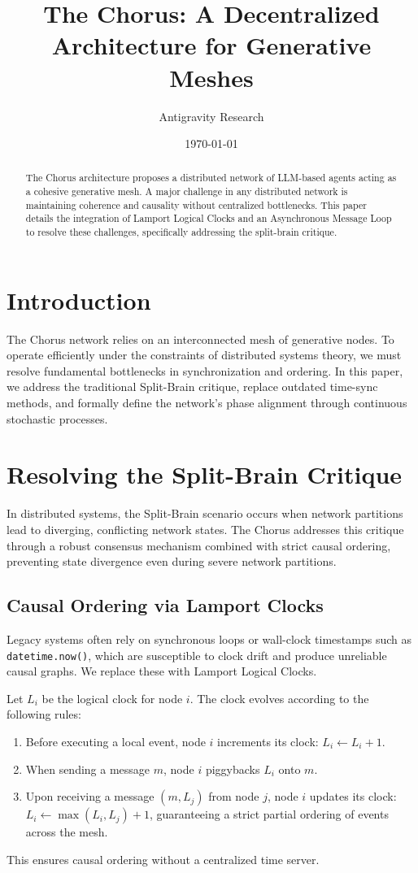 \documentclass{article}
\title{The Chorus: A Decentralized Architecture for Generative Meshes}
\author{Antigravity Research}
\date{\today}
\begin{document}
\maketitle

\begin{abstract}
The Chorus architecture proposes a distributed network of LLM-based agents acting as a cohesive generative mesh. A major challenge in any distributed network is maintaining coherence and causality without centralized bottlenecks. This paper details the integration of Lamport Logical Clocks and an Asynchronous Message Loop to resolve these challenges, specifically addressing the split-brain critique.
\end{abstract}

\section{Introduction}
The Chorus network relies on an interconnected mesh of generative nodes. To operate efficiently under the constraints of distributed systems theory, we must resolve fundamental bottlenecks in synchronization and ordering. In this paper, we address the traditional Split-Brain critique, replace outdated time-sync methods, and formally define the network's phase alignment through continuous stochastic processes.

\section{Resolving the Split-Brain Critique}
In distributed systems, the Split-Brain scenario occurs when network partitions lead to diverging, conflicting network states. The Chorus addresses this critique through a robust consensus mechanism combined with strict causal ordering, preventing state divergence even during severe network partitions.

\subsection{Causal Ordering via Lamport Clocks}
Legacy systems often rely on synchronous loops or wall-clock timestamps such as \texttt{datetime.now()}, which are susceptible to clock drift and produce unreliable causal graphs. We replace these with Lamport Logical Clocks.

Let $L_i$ be the logical clock for node $i$. The clock evolves according to the following rules:
\begin{enumerate}
    \item Before executing a local event, node $i$ increments its clock: $L_i \leftarrow L_i + 1$.
    \item When sending a message $m$, node $i$ piggybacks $L_i$ onto $m$.
    \item Upon receiving a message $(m, L_j)$ from node $j$, node $i$ updates its clock: $L_i \leftarrow \max(L_i, L_j) + 1$, guaranteeing a strict partial ordering of events across the mesh.
\end{enumerate}
This ensures causal ordering without a centralized time server.
\end{document}
